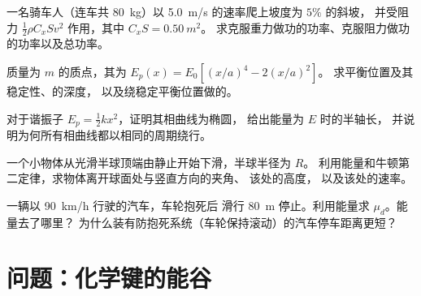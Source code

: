 \begin{exercise}[$\star\star$]\label{exo:b1:work-and-energy:8}
一名骑车人（连车共 \qty{80}{kg}）以 \qty{5.0}{m/s} 的速率爬上坡度为 $5\%$ 的斜坡，
并受阻力 $\tfrac12\rho C_xSv^2$ 作用，其中 $C_xS = \qty{0.50}{m^2}$。
求克服重力做功的功率、克服阻力做功的功率以及总功率。
\end{exercise}

\begin{exercise}[$\star\star$]\label{exo:b1:work-and-energy:9}
质量为 $m$ 的质点，其为 $E_p(x) = E_0[(x/a)^4 - 2(x/a)^2]$。
求平衡位置及其稳定性、的深度，
以及绕稳定平衡位置做的。
\end{exercise}

\begin{exercise}[$\star\star\star$]\label{exo:b1:work-and-energy:10}
对于谐振子 $E_p = \tfrac12 kx^2$，证明其相曲线为椭圆，
给出能量为 $E$ 时的半轴长，
并说明为何所有相曲线都以相同的周期绕行。
\end{exercise}

\begin{exercise}[$\star\star\star$]\label{exo:b1:work-and-energy:11}
一个小物体从光滑半球顶端由静止开始下滑，半球半径为 $R$。
利用能量和牛顿第二定律，求物体离开球面处与竖直方向的夹角、
该处的高度，
以及该处的速率。
\end{exercise}

\begin{exercise}[$\star\star\star$]\label{exo:b1:work-and-energy:12}
一辆以 \qty{90}{km/h} 行驶的汽车，车轮抱死后
滑行 \qty{80}{m} 停止。利用能量求 $\mu_d$。能量去了哪里？
为什么装有防抱死系统（车轮保持滚动）的汽车停车距离更短？
\end{exercise}

\section{问题：化学键的能谷}

